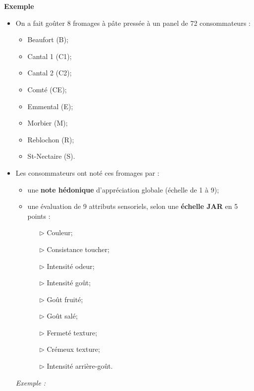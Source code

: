 \documentclass[aspectratio=169,xcolor=dvipsnames]{beamer}
\begin{document}
\begin{frame}
	\begin{exampleblock}{\textbf{Exemple}}
		\begin{itemize}
		\item On a fait goûter 8 fromages à pâte pressée à un panel de 72 consommateurs :
		\setlength{\columnsep}{0.02cm}
			\begin{multicols}{4}
			\begin{itemize}
			\item Beaufort (B);
			\item Cantal 1 (C1);
			\item Cantal 2 (C2);
			\item Comté (CE);
			\item Emmental (E);
			\item Morbier (M);
			\item Reblochon (R);
			\item St-Nectaire (S).
			\end{itemize}
			\end{multicols}
		\item Les consommateurs ont noté ces fromages par :
			\begin{itemize}
			\item une \textbf{note hédonique} d'appréciation globale (échelle de 1 à 9);
			\item une évaluation de 9 attributs sensoriels, selon une \textbf{échelle JAR} en 5 points :
			\setlength{\columnsep}{-0.8cm}
				\begin{multicols}{3}
				\begin{itemize}
				\item[$\triangleright$] Couleur;
				\item[$\triangleright$] Consistance toucher;
				\item[$\triangleright$] Intensité odeur;
				\item[$\triangleright$] Intensité goût;
				\item[$\triangleright$] Goût fruité;
				\item[$\triangleright$] Goût salé;
				\item[$\triangleright$] Fermeté texture;
				\item[$\triangleright$] Crémeux texture;
				\item[$\triangleright$] Intensité arrière-goût.
				\end{itemize}
				\end{multicols}
			\end{itemize}
		\begin{scriptsize}
			\emph{Exemple :}
				

\end{scriptsize}
\end{itemize}
\end{exampleblock}
\end{frame}
\end{document}
